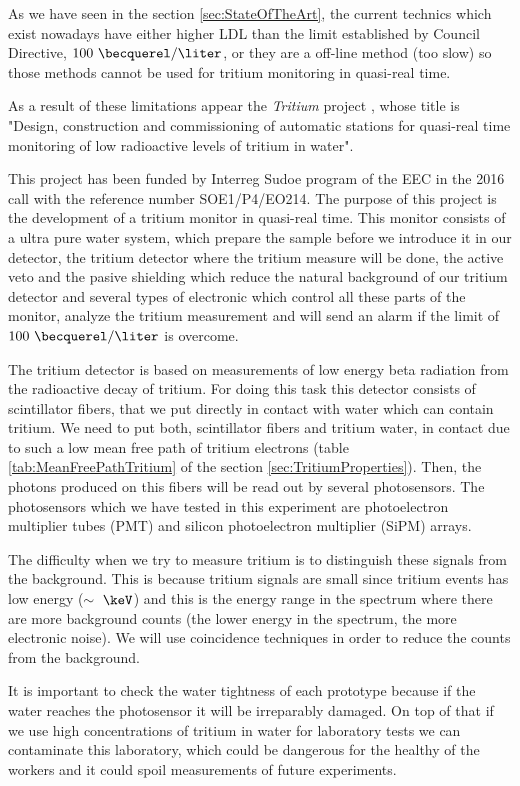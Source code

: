 As we have seen in the section \ref{sec:StateOfTheArt}, the current technics which exist nowadays have either higher LDL than the limit established by Council Directive, $100~\becquerel/\liter$, or they are a off-line method (too slow) so those methods cannot be used for tritium monitoring in quasi-real time. 

As a result of these limitations appear the \textit{Tritium} project \cite{TRITIUM}, whose title is "Design, construction and commissioning of automatic stations for quasi-real time monitoring of low radioactive levels of tritium in water".

This project has been funded by Interreg Sudoe program of the EEC in the 2016 call with the reference number SOE1/P4/EO214. The purpose of this project is the development of a tritium monitor in quasi-real time. This monitor consists of a ultra pure water system, which prepare the sample before we introduce it in our detector, the tritium detector where the tritium measure will be done, the active veto and the pasive shielding which reduce the natural background of our tritium detector and several types of electronic which control all these parts of the monitor, analyze the tritium measurement and will send an alarm if the limit of $100~\becquerel/\liter$ is overcome.

The tritium detector is based on measurements of low energy beta radiation from the radioactive decay of tritium. For doing this task this detector consists of scintillator fibers, that we put directly in contact with water which can contain tritium. We need to put both, scintillator fibers and tritium water, in contact due to such a low mean free path of tritium electrons (table \ref{tab:MeanFreePathTritium} of the section \ref{sec:TritiumProperties}). Then, the photons produced on this fibers will be read out by several photosensors. The photosensors which we have tested in this experiment are photoelectron multiplier tubes (PMT) and silicon photoelectron multiplier (SiPM) arrays. 

The difficulty when we try to measure tritium is to distinguish these signals from the background. This is because tritium signals are small since tritium events has low energy ($\sim~\keV$) and this is the energy range in the spectrum where there are more background counts (the lower energy in the spectrum, the more electronic noise). We will use coincidence techniques in order to reduce the counts from the background.

It is important to check the water tightness of each prototype because if the water reaches the photosensor it will be irreparably damaged. On top of that if we use high concentrations of tritium in water for laboratory tests we can contaminate this laboratory, which could be dangerous for the healthy of the workers and it could spoil measurements of future experiments.

